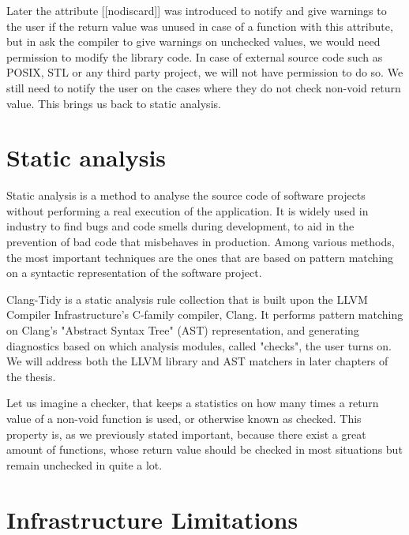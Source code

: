 Later the attribute [[nodiscard]] was introduced to notify and give warnings to the user if the return value was unused in case of a function
with this attribute, but in ask the compiler to give warnings on unchecked values, we would need permission to modify the library code.
In case of external source code such as POSIX, STL or any third party project, we will not have permission to do so.
We still need to notify the user on the cases where they do not check non-void return value. This brings us back to static analysis.

\section{Static analysis}

Static analysis is a method to analyse the source code of software projects without performing a real execution of the application.
It is widely used in industry to find bugs and code smells during development, to aid in the prevention of bad code that misbehaves in
production.
Among various methods, the most important techniques are the ones that are based on pattern matching on a syntactic representation of
the software project.

\par Clang-Tidy is a static analysis rule collection that is built upon the LLVM Compiler Infrastructure's C-family compiler, Clang.
It performs pattern matching on Clang's "Abstract Syntax Tree" (AST) representation, and generating diagnostics based on which analysis
modules, called "checks", the user turns on. We will address both the LLVM library and AST matchers in later chapters of the thesis.

\par Let us imagine a checker, that keeps a statistics on how many times a return value of a non-void function is used, or otherwise known
as checked. This property is, as we previously stated important, because there exist a great amount of functions,
whose return value should be checked in most situations but remain unchecked in quite a lot.

\section{Infrastructure Limitations}

